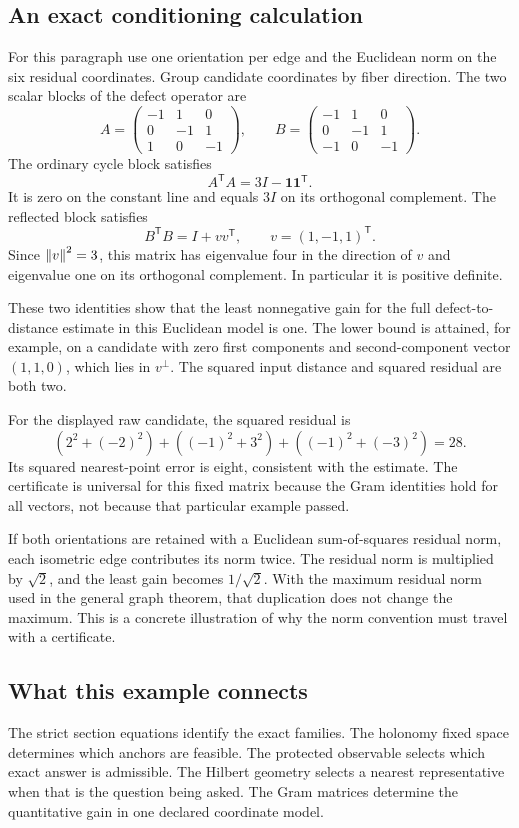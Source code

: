 \subsection{An exact conditioning calculation}
For this paragraph use one orientation per edge and the Euclidean norm on the six residual coordinates. Group candidate coordinates by fiber direction. The two scalar blocks of the defect operator are
\[
 A=\begin{pmatrix}-1&1&0\\0&-1&1\\1&0&-1\end{pmatrix},\qquad
 B=\begin{pmatrix}-1&1&0\\0&-1&1\\-1&0&-1\end{pmatrix}.
\]
The ordinary cycle block satisfies
\[
 A^{\mathsf T}A=3I-\mathbf1\mathbf1^{\mathsf T}.
\]
It is zero on the constant line and equals \(3I\) on its orthogonal complement. The reflected block satisfies
\[
 B^{\mathsf T}B=I+vv^{\mathsf T},\qquad v=(1,-1,1)^{\mathsf T}.
\]
Since \(\left\lVert v\right\rVert^2=3\), this matrix has eigenvalue four in the direction of \(v\) and eigenvalue one on its orthogonal complement. In particular it is positive definite.

These two identities show that the least nonnegative gain for the full defect-to-distance estimate in this Euclidean model is one. The lower bound is attained, for example, on a candidate with zero first components and second-component vector \((1,1,0)\), which lies in \(v^\perp\). The squared input distance and squared residual are both two.

For the displayed raw candidate, the squared residual is
\[
 (2^2+(-2)^2)+((-1)^2+3^2)+((-1)^2+(-3)^2)=28.
\]
Its squared nearest-point error is eight, consistent with the estimate. The certificate is universal for this fixed matrix because the Gram identities hold for all vectors, not because that particular example passed.

If both orientations are retained with a Euclidean sum-of-squares residual norm, each isometric edge contributes its norm twice. The residual norm is multiplied by \(\sqrt2\), and the least gain becomes \(1/\sqrt2\). With the maximum residual norm used in the general graph theorem, that duplication does not change the maximum. This is a concrete illustration of why the norm convention must travel with a certificate.

\subsection{What this example connects}
The strict section equations identify the exact families. The holonomy fixed space determines which anchors are feasible. The protected observable selects which exact answer is admissible. The Hilbert geometry selects a nearest representative when that is the question being asked. The Gram matrices determine the quantitative gain in one declared coordinate model.

